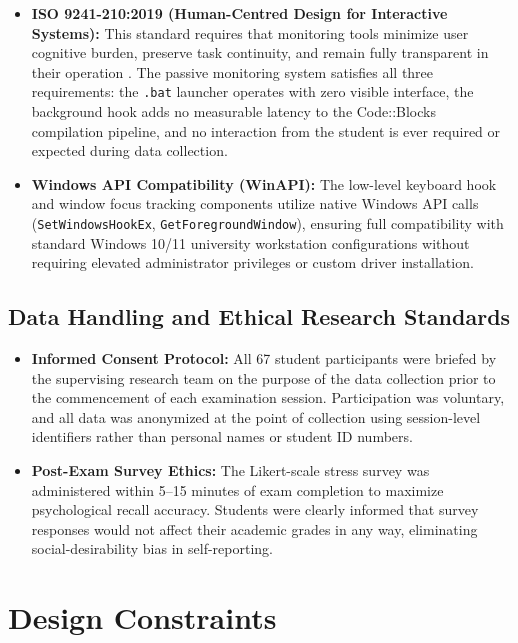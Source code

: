\begin{itemize}
    \item \textbf{ISO 9241-210:2019 (Human-Centred Design for Interactive Systems):} This standard requires that monitoring tools minimize user cognitive burden, preserve task continuity, and remain fully transparent in their operation \cite{iso9241}. The passive monitoring system satisfies all three requirements: the \texttt{.bat} launcher operates with zero visible interface, the background hook adds no measurable latency to the Code::Blocks compilation pipeline, and no interaction from the student is ever required or expected during data collection.

    \item \textbf{Windows API Compatibility (WinAPI):} The low-level keyboard hook and window focus tracking components utilize native Windows API calls (\texttt{SetWindowsHookEx}, \texttt{GetForegroundWindow}), ensuring full compatibility with standard Windows 10/11 university workstation configurations without requiring elevated administrator privileges or custom driver installation.
\end{itemize}

\subsection{Data Handling and Ethical Research Standards}
\begin{itemize}
    \item \textbf{Informed Consent Protocol:} All 67 student participants were briefed by the supervising research team on the purpose of the data collection prior to the commencement of each examination session. Participation was voluntary, and all data was anonymized at the point of collection using session-level identifiers rather than personal names or student ID numbers.

    \item \textbf{Post-Exam Survey Ethics:} The Likert-scale stress survey was administered within 5--15 minutes of exam completion to maximize psychological recall accuracy. Students were clearly informed that survey responses would not affect their academic grades in any way, eliminating social-desirability bias in self-reporting.
\end{itemize}

\section{Design Constraints}
\label{sec:constraints}

